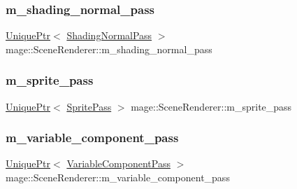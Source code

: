 \hypertarget{classmage_1_1_scene_renderer_a183c95ded274991bc80dccd8a373cce5}{}\label{classmage_1_1_scene_renderer_a183c95ded274991bc80dccd8a373cce5} 
\subsubsection{\texorpdfstring{m\+\_\+shading\+\_\+normal\+\_\+pass}{m\_shading\_normal\_pass}}
{\footnotesize\ttfamily \hyperlink{namespacemage_a3316d7143a973e37adf1110f2e80ca31}{Unique\+Ptr}$<$ \hyperlink{classmage_1_1_shading_normal_pass}{Shading\+Normal\+Pass} $>$ mage\+::\+Scene\+Renderer\+::m\+\_\+shading\+\_\+normal\+\_\+pass\hspace{0.3cm}{\ttfamily [private]}}

\hypertarget{classmage_1_1_scene_renderer_a39d0db7aa9275362cd460339143a089b}{}\label{classmage_1_1_scene_renderer_a39d0db7aa9275362cd460339143a089b} 
\subsubsection{\texorpdfstring{m\+\_\+sprite\+\_\+pass}{m\_sprite\_pass}}
{\footnotesize\ttfamily \hyperlink{namespacemage_a3316d7143a973e37adf1110f2e80ca31}{Unique\+Ptr}$<$ \hyperlink{classmage_1_1_sprite_pass}{Sprite\+Pass} $>$ mage\+::\+Scene\+Renderer\+::m\+\_\+sprite\+\_\+pass\hspace{0.3cm}{\ttfamily [private]}}

\hypertarget{classmage_1_1_scene_renderer_af3544515e1792eb3b1c1e511b1bccf46}{}\label{classmage_1_1_scene_renderer_af3544515e1792eb3b1c1e511b1bccf46} 
\subsubsection{\texorpdfstring{m\+\_\+variable\+\_\+component\+\_\+pass}{m\_variable\_component\_pass}}
{\footnotesize\ttfamily \hyperlink{namespacemage_a3316d7143a973e37adf1110f2e80ca31}{Unique\+Ptr}$<$ \hyperlink{classmage_1_1_variable_component_pass}{Variable\+Component\+Pass} $>$ mage\+::\+Scene\+Renderer\+::m\+\_\+variable\+\_\+component\+\_\+pass\hspace{0.3cm}{\ttfamily [private]}}

